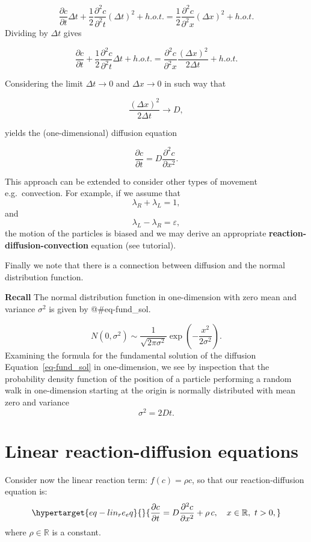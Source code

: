 \documentclass[
  letterpaper,
  DIV=11,
  numbers=noendperiod]{scrreprt}
\theoremstyle{plain}
\theoremstyle{definition}
\theoremstyle{plain}
\theoremstyle{remark}
\begin{document}
\[
 \frac{ \partial c}{\partial t} \Delta t + \frac 12  \frac{ \partial^2 c}{\partial^2 t} (\Delta t )^2  + h.o.t. =
 \frac 12  \frac{ \partial^2 c}{\partial^2 x} (\Delta x )^2  + h.o.t. 
\] Dividing by \(\Delta t\) gives

\[
 \frac{ \partial c}{\partial t}  + \frac 12  \frac{ \partial^2 c}{\partial^2 t} \Delta t   + h.o.t. =
   \frac{ \partial^2 c}{\partial^2 x} \frac{(\Delta x )^2 }{2\Delta t} + h.o.t. 
\]

Considering the limit \(\Delta t \to 0\) and \(\Delta x \to 0\) in such
way that

\[
 \frac{(\Delta x )^2 }{2\Delta t} \to D,
\]

yields the (one-dimensional) diffusion equation

\[
\frac{\partial c}{\partial t} = D \frac{\partial^2 c}{\partial x^2}.
\]

This approach can be extended to consider other types of movement
e.g.~convection. For example, if we assume that\\
\[
\lambda_R+ \lambda_L =1,
\] and \[
\lambda_L - \lambda_R = \varepsilon,
\] the motion of the particles is biased and we may derive an
appropriate \textbf{reaction-diffusion-convection} equation (see
tutorial).

Finally we note that there is a connection between diffusion and the
normal distribution function.

\textbf{Recall} The normal distribution function in one-dimension with
zero mean and variance \(\sigma^2\) is given by @\#eq-fund\_sol.

\[
N(0, \sigma^2) \sim \frac 1 { \sqrt{ 2 \pi \sigma^2}} \exp \left( - \frac{x^2}{ 2 \sigma^2}\right).
\] Examining the formula for the fundamental solution of the diffusion
Equation~\ref{eq-fund_sol} in one-dimension, we see by inspection that
the probability density function of the position of a particle
performing a random walk in one-dimension starting at the origin is
normally distributed with mean zero and variance \[
\sigma^2 = 2 D t.
\]

\hypertarget{linear-reaction-diffusion-equations-1}{%
\section{Linear reaction-diffusion
equations}\label{linear-reaction-diffusion-equations-1}}

Consider now the linear reaction term: \(f(c) = \rho c\), so that our
reaction-diffusion equation is:
\begin{equation}\protect\hypertarget{eq-lin_re_eq}{}{
\frac{\partial c}{\partial t} = D \frac{\partial^2 c}{\partial x^2}   + \rho \, c, \quad x\in \mathbb R, \, \, t >0, 
}\label{eq-lin_re_eq}\end{equation} where \(\rho \in \mathbb R\) is a
constant.
\end{document}
